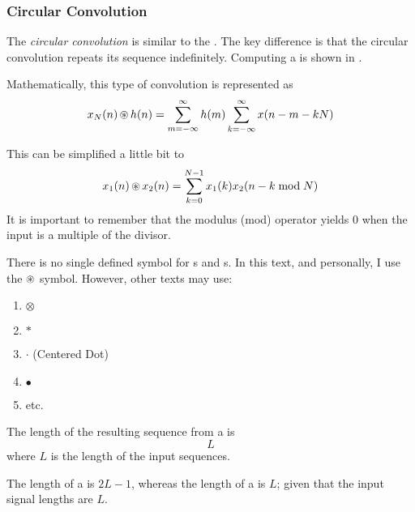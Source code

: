 \subsubsection{Circular Convolution}\label{subsubsec:DFT_Properties-Circular_Convolution}
\begin{definition}\label{def:Circular_Convolution}
  The \emph{circular convolution} is similar to the .
  The key difference is that the circular convolution repeats its sequence indefinitely.
  Computing a  is shown in .

  Mathematically, this type of convolution is represented as
  \begin{equation}\label{eq:Circular_Convolution}
    x_{N}(n) \operatorname{\circledast} h(n) = \sum\limits_{m=-\infty}^{\infty} h(m) \sum\limits_{k=-\infty}^{\infty} x(n-m-kN)
  \end{equation}

  This can be simplified a little bit to
  \begin{equation}\label{eq:Circular_Convolution-Simplified}
    x_{1}(n) \operatorname{\circledast} x_{2}(n) = \sum\limits_{k=0}^{N-1} x_{1}(k) x_{2}(n-k \bmod N)
  \end{equation}
  It is important to remember that the modulus (mod) operator yields 0 when the input is a multiple of the divisor.

  \begin{remark}
    There is no single defined symbol for s and s.
    In this text, and personally, I use the $\operatorname{\circledast}$ symbol.
    However, other texts may use:
    \begin{enumerate}[noitemsep]
    \item $\otimes$
    \item $*$
    \item $\cdot$ (Centered Dot)
    \item $\bullet$
    \item etc.
    \end{enumerate}
  \end{remark}
  
  \begin{remark}\label{rmk:Circular_Convolution_Length}
    The length of the resulting sequence from a  is
    \begin{equation}\label{eq:Circular_Convolution_Length}
      L
    \end{equation}
    where $L$ is the length of the input sequences.
  \end{remark}

  \begin{remark}
    The length of a  is $2L-1$, whereas the length of a  is $L$; given that the input signal lengths are $L$.
  \end{remark}
\end{definition}

